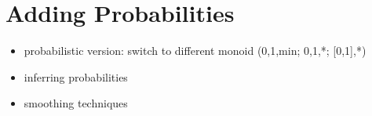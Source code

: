 \chapter{Adding Probabilities}
\label{cha:PSL}

\begin{itemize}
    \item probabilistic version: switch to different monoid (0,1,min; 0,1,*; [0,1],*)
    \item inferring probabilities
    \item smoothing techniques
\end{itemize}
